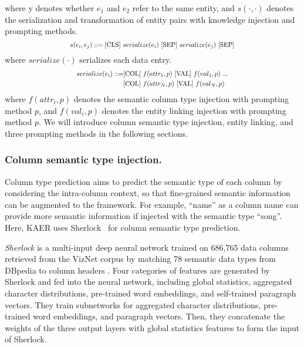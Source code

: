 where y denotes whether $e_1$ and $e_2$ refer to the same entity, and $s(\cdot,\cdot)$ denotes the serialization and transformation of entity pairs with knowledge injection and prompting methods. 
\begin{equation}
\Scale[0.8]{
    s(e_i, e_j) ::=  \text{[CLS]}\ serialize(e_i)\ \text{[SEP]}\ serialize(e_j)\ \text{[SEP]}} 
\end{equation}
where $serialize(\cdot)$ serializes each data entry.
\begin{equation}\Scale[0.8]{
\begin{split}
serialize(e_i) ::= & \text{[COL]}\ f(attr_1,p)\ \text{[VAL]}\ f(val_1,p)\ ...\\
            & \text{[COL]}\ f(attr_N,p)\ \text{[VAL]}\ f(val_N,p)   
\end{split}}
\end{equation}
where $f(attr_i, p)$ denotes the semantic column type injection with prompting method $p$, and $f(val_i, p)$ denotes the entity linking injection with prompting method $p$. We will introduce column semantic type injection, entity linking, and three prompting methods in the following sections.


\subsubsection{Column semantic type injection.}
Column type prediction aims to predict the semantic type of each column by considering the intra-column context, so that fine-grained semantic information can be augmented to the framework. For example, ``name'' as a column name can provide more semantic information if injected with the semantic type ``song''. Here, KAER uses Sherlock~\cite{hulsebos_sherlock_2019} for column semantic type prediction. %


\textit{Sherlock} is a multi-input deep neural network trained on 686,765 data columns retrieved from the VizNet corpus by matching 78 semantic data types from DBpedia to column headers \cite{hulsebos_sherlock_2019}. Four categories of features are generated by Sherlock and fed into the neural network, including global statistics, aggregated character distributions, pre-trained word embeddings, and self-trained paragraph vectors. They train subnetworks for aggregated character distributions, pre-trained word embeddings, and paragraph vectors. Then, they concatenate the weights of the three output layers with global statistics features to form the input of Sherlock.


